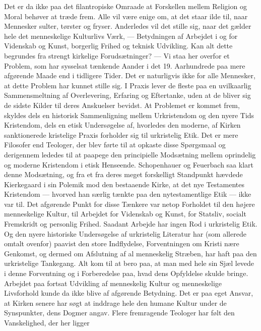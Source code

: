 \documentclass[12pt,a4paper,openany]{book}
\newcommand{\opage}[1]{\marginnote{\footnotesize\textit{[#1]}}}
\begin{document}
Det er da ikke paa det filantropiske Omraade at Forskellen mellem
Religion og Moral behøver at træde frem. Alle vil være enige om,
at det staar ilde til, naar Mennesker sulter, tørster og fryser. Anderledes
vil det stille sig, naar det gælder hele det menneskelige Kulturlivs
Værk, --- Betydningen af Arbejdet i og for Videnskab og Kunst,
borgerlig Frihed og teknisk Udvikling. Kan alt dette begrundes fra
strengt kirkelige Forudsætninger? --- Vi staa her overfor et Problem,
som har sysselsat tænkende Aander i det 19. Aarhundrede paa mere
afgørende Maade end i tidligere Tider. Det er naturligvis ikke for
alle Mennesker, at dette Problem har kunnet stille sig. I Praxis lever
de fleste paa en uvilkaarlig Sammensmeltning af Overlevering, Erfaring
og Eftertanke, uden at de bliver sig de sidste Kilder til deres
Anskuelser bevidst. At Problemet er kommet frem, skyldes dels en
historisk Sammenligning mellem Urkristendom og den nyere Tids
Kristendom, dels en etisk Undersøgelse af, hvorledes den moderne,
af Kirken sanktionerede kristelige Praxis forholder sig til urkristelig
Etik. Det er mere Filosofer end Teologer, der blev førte til at opkaste
disse Spørgsmaal og derigennem lededes til at paapege den
principielle Modsætning mellem oprindelig og moderne Kristendom
i etisk Henseende. Schopenhauer og Feuerbach saa klart denne Modsætning,
og fra et fra deres meget forskelligt Standpunkt hævdede
Kierkegaard i sin Polemik mod den bestaaende Kirke, at det nye
Testamentes Kristendom --- hvorved han særlig tænkte paa den
nytestamentlige Etik --- ikke var til. Det afgørende Punkt for disse
Tænkere var netop Forholdet til den højere menneskelige Kultur, til
Arbejdet for Videnskab og Kunst, for Statsliv, socialt Fremskridt og
\opage{145}personlig Frihed. Saadant Arbejde har ingen Rod i urkristelig Etik.
Og den nyere historiske Undersøgelse af urkristelig Literatur har
(som allerede omtalt ovenfor) paavist den store Indflydelse, Forventningen
om Kristi nære Genkomst, og dermed om Afslutning af
al menneskelig Stræben, har haft paa den urkristelige Tankegang.
Alt kom til at bero paa, at man med hele sin Sjæl levede i denne
Forventning og i Forberedelse paa, hvad dens Opfyldelse skulde
bringe. Arbejdet paa fortsat Udvikling af menneskelig Kultur og
menneskelige Livsforhold kunde da ikke blive af afgørende Betydning.
Det er paa eget Ansvar, at Kirken senere har søgt at inddrage
hele den humane Kultur under de Synspunkter, dens Dogmer angav.
Flere fremragende Teologer har følt den Vanskelighed, der her ligger
\end{document}

